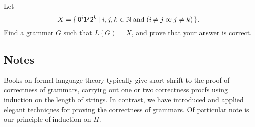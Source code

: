 \begin{exercise}
Let
\begin{displaymath}
X = \{ \, \mathsf{0}^i\mathsf{1}^j\mathsf{2}^k \mid i,j,k\in\mathbb{N}\;\allowbreak\mbox{and}\allowbreak\;
(i\neq j\;\allowbreak\mbox{or}\allowbreak\;j\neq k) \, \} .
\end{displaymath}
Find a grammar $G$ such that $L(G) = X$, and prove that your answer is
correct.
\end{exercise}

\subsection{Notes}

Books on formal language theory typically give short shrift to the
proof of correctness of grammars, carrying out one or two
correctness proofs using induction on the length of strings.  In
contrast, we have introduced and applied elegant techniques for
proving the correctness of grammars.  Of particular note is our principle
of induction on $\Pi$.


